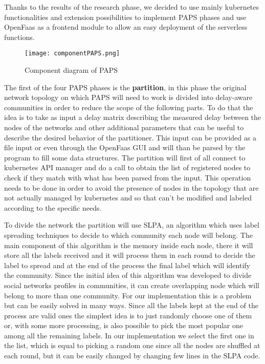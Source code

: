 Thanks to the results of the research phase, we decided to use mainly kubernetes functionalities
and extension possibilities to implement PAPS phases and use OpenFaas as a frontend module to 
allow an easy deployment of the serverless functions.
\begin{figure}[h]
    \texttt{[image: componentPAPS.png]}
    \label{fig:component}
    \caption{Component diagram of PAPS}
\end{figure}

The first of the four PAPS phases is the \textbf{partition}, in this phase the original 
network topology on which PAPS will need to work is divided into delay-aware communities in 
order to reduce the scope of the following parts. To do that the idea is to take as input a 
delay matrix describing the measured delay between the nodes of the networks and other 
additional parameters that can be useful to describe the desired behavior of the partitioner.
This input can be provided as a file input or even through the OpenFaas GUI and will than be
parsed by the program to fill some data structures. The partition will first of all connect to 
kubernetes API manager and do a call to obtain the list of registered nodes to check if they 
match with what has been parsed from the input. This operation needs to be done in order to
avoid the presence of nodes in the topology that are not actually managed by kubernetes and 
so that can't be modified and labeled according to the specific needs. 

To divide the network the partition will use SLPA, an algorithm which uses label spreading 
techniques to decide to which community each node will belong. The main component of this 
algorithm is the memory inside each node, there it will store all the labels received and 
it will process them in each round to decide the label to spread and at the end of the 
process the final label which will identify the community. Since the initial idea of this 
algorithm was developed to divide social networks profiles in communities, it can create 
overlapping node which will belong to more than one community. For our implementation this
is a problem but can be easily solved in many ways. Since all the labels kept at the end 
of the process are valid ones the simplest idea is to just randomly choose one of them or,
with some more processing, is also possible to pick the most popular one among all the 
remaining labels. In our implementation we select the first one in the list, which is 
equal to picking a random one since all the nodes are shuffled at each round, but it can 
be easily changed by changing few lines in the SLPA code.

